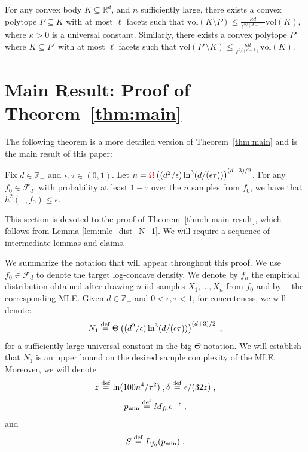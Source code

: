 \documentclass[final,12pt]{colt2018}
\newcommand{\nnew}[1]{{\color{red} #1}}
\newcommand{\nnew}[1]{#1}
\newcommand{\new}[1]{{\color{red} #1}}
\newcommand{\new}[1]{{#1}}
\newtheorem{informal theorem}[theorem]{Theorem (informal statement)}
\newcommand{\eqdef}{\stackrel{{\mathrm {\footnotesize def}}}{=}}
\newcommand{\Z}{\mathbb{Z}}
\newcommand{\eps}{\epsilon}
\newcommand{\mle}{\mathop{\hat{f}_n}}
\newcommand{\pmin}{\mathop{p_{\mathrm{min}}}}
\newcommand{\vol}{\mathrm{vol}}
\begin{document}
\begin{theorem}\label{thm:inside_poly}\label{thm:outside_poly}
For any convex body $K \subseteq \mathbb{R}^d$, and $n$ sufficiently large, 
there exists a convex polytope $P \subseteq K$ with at most $\ell$ facets such that $\vol(K \setminus P) \leq \frac{\kappa d}{\ell^{2/(d-1)}}\vol(K)$, 
where $\kappa > 0$ is a universal constant.
Similarly, there exists a convex polytope $P'$ where $K \subseteq P'$ 
with at most $\ell$ facets such that $\vol(P' \setminus K) \leq \frac{\kappa d}{\ell^{2/(d-1)}}\vol(K)$.
\end{theorem}



\section{Main Result: Proof of Theorem~\ref{thm:main}} \label{sec:main-section}

The following theorem is a more detailed version of Theorem~\ref{thm:main} and is the main result of this paper:


\begin{theorem}\label{thm:h-main-result}
Fix $d \in \Z_+$ and \nnew{$\eps, \tau \in (0,1)$}. 
Let $n = \nnew{\Omega} \left( (d^2/\eps) \ln^3(d/(\eps\tau))  \right)^{(d+3)/2}$. 
For any $f_0 \in  \mathcal{F}_d$, with probability at least $1-\tau$ over the $n$ samples from $f_0$, we have that $h^2(\mle, f_0) \leq \eps$.
\end{theorem}

This section is devoted to the proof of Theorem~\ref{thm:h-main-result}, which follows from Lemma \ref{lem:mle_dist_N_1}.
We will require a sequence of intermediate lemmas and claims. 


\new{We summarize the notation that will appear throughout this proof. 
We use $f_0 \in \mathcal{F}_d$ to denote the target log-concave density.
We denote by $f_n$ the empirical distribution obtained after drawing $n$ iid samples $X_1, \ldots, X_n$ from $f_0$
and by $\mle$ the corresponding MLE. Given $d \in \Z_+$ and $0<\eps, \tau<1$, for concreteness, 
we will denote:
$$N_1 \eqdef \Theta\left( (d^2/\eps) \ln^3(d/(\eps\tau)) \right)^{(d+3)/2} \;,$$ 
for a sufficiently large universal constant in the big-$\Theta$ notation.
We will establish that $N_1$ is an upper bound on the desired sample complexity of the MLE.
Moreover, we will denote
$$z \eqdef \ln (100 n^4 /\tau^2) \;, \delta \eqdef \eps / (32 z) \;,$$ 
$$\pmin \eqdef M_{f_0} e^{-z} \;,$$
and 
$$S \eqdef L_{f_0}(\pmin) \;.$$
}
\end{document}

